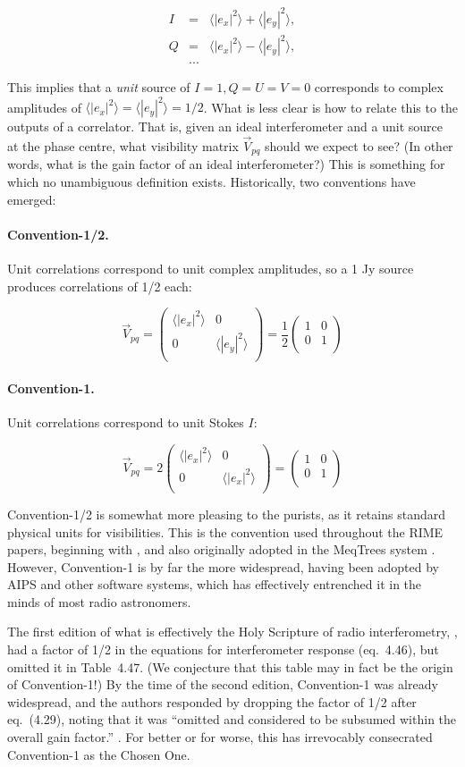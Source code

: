 \documentclass[]{aa}
\newcommand{\matrixtt}[4]{\left( \begin{array}{cc}#1&#2\\#3&#4\\\end{array} \right)}
\begin{document}
\begin{eqnarray*}
I&=&\langle |e_x|^2\rangle  + \langle |e_y|^2\rangle , \\
Q&=&\langle |e_x|^2\rangle  - \langle |e_y|^2\rangle , \\
&...&
\end{eqnarray*}

This implies that a {\em unit} source of $I=1, Q=U=V=0$ corresponds to complex amplitudes of $\langle |e_x|^2\rangle =\langle |e_y|^2\rangle = 1/2$. What is less clear is how to relate this to the outputs of a correlator. That is, given an ideal interferometer and a unit source at the phase centre, what visibility matrix $\vec V_{pq}$ should we expect to see? (In other words, what is the gain factor of an ideal interferometer?) This is something for which no unambiguous definition exists. Historically, two conventions have emerged:

\paragraph{Convention-1/2.} Unit correlations correspond to unit complex amplitudes, so a 1 Jy source produces correlations of 1/2 each: 

\[
\vec V_{pq} = \matrixtt{\langle |e_x|^2\rangle }{0}{0}{\langle |e_y|^2\rangle } = \frac{1}{2}\matrixtt{1}{0}{0}{1}
\]

\paragraph{Convention-1.} Unit correlations correspond to unit Stokes $I$:

\[
\vec V_{pq} = 2\matrixtt{\langle |e_x|^2\rangle }{0}{0}{\langle |e_x|^2\rangle } = \matrixtt{1}{0}{0}{1}
\]

Convention-1/2 is somewhat more pleasing to the purists, as it retains standard physical units for visibilities. This is the convention used throughout the RIME papers, beginning with \citet{ME1}, and also originally adopted in the MeqTrees system \citep{meqtrees}. However, Convention-1 is by far the more widespread, having been adopted by AIPS and other software systems, which has effectively entrenched it in the minds of most radio astronomers.

The first edition of what is effectively the Holy Scripture of radio interferometry, \citet*{tms1}, had a factor of 1/2 in the equations for interferometer response (eq.~4.46), but omitted it in Table~4.47. (We conjecture that this table may in fact be the origin of Convention-1!) By the time of the second edition, Convention-1 was already widespread, and the authors responded by dropping the factor of 1/2 after eq.~(4.29), noting that it was ``omitted and considered to be subsumed within the overall gain factor.'' \citep[see p. 102]{tms}. For better or for worse, this has irrevocably consecrated Convention-1 as the Chosen One.
\end{document}

